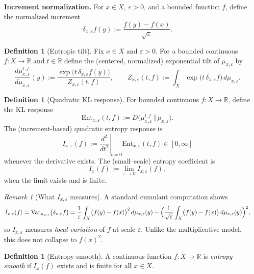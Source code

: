 \documentclass[11pt]{amsart}
\theoremstyle{definition}
\newtheorem{definition}[theorem]{Definition}
\theoremstyle{remark}
\newtheorem{remark}[theorem]{Remark}
\begin{document}
\medskip
\noindent\textbf{Increment normalization.}
For $x\in X$, $\varepsilon>0$, and a bounded function $f$, define the normalized increment
\[
\delta_{x,\varepsilon} f(y):=\frac{f(y)-f(x)}{\sqrt{\varepsilon}}.
\]

\begin{definition}[Entropic tilt]
Fix $x\in X$ and $\varepsilon>0$. For a bounded continuous $f:X\to\mathbb{R}$ and $t\in\mathbb{R}$ define the (centered, normalized) exponential tilt of $\mu_{x,\varepsilon}$ by
\[
\frac{d\mu^{t,f}_{x,\varepsilon}}{d\mu_{x,\varepsilon}}(y)
:= \frac{\exp\bigl(t\,\delta_{x,\varepsilon} f(y)\bigr)}{Z_{x,\varepsilon}(t,f)},
\qquad
Z_{x,\varepsilon}(t,f):=\int_X \exp\bigl(t\,\delta_{x,\varepsilon} f\bigr)\,d\mu_{x,\varepsilon}.
\]
\end{definition}

\begin{definition}[Quadratic KL response]
For bounded continuous $f:X\to\mathbb{R}$, define the KL response
\[
\mathrm{Ent}_{x,\varepsilon}(t,f):=D\bigl(\mu^{t,f}_{x,\varepsilon}\,\Vert\,\mu_{x,\varepsilon}\bigr).
\]
The (increment-based) quadratic entropy response is
\[
I_{x,\varepsilon}(f)
:= \left.\frac{d^2}{dt^2}\right|_{t=0} \mathrm{Ent}_{x,\varepsilon}(t,f)
\in[0,\infty]
\]
whenever the derivative exists.  The (small--scale) entropy coefficient is
\[
I_x(f):=\lim_{\varepsilon\to 0} I_{x,\varepsilon}(f),
\]
when the limit exists and is finite.
\end{definition}

\begin{remark}[What $I_{x,\varepsilon}$ measures]
A standard cumulant computation shows
\[
I_{x,\varepsilon}(f)=\mathrm{Var}_{\mu_{x,\varepsilon}}\bigl(\delta_{x,\varepsilon} f\bigr)
=\frac{1}{\varepsilon}\int_X \bigl(f(y)-f(x)\bigr)^2\,d\mu_{x,\varepsilon}(y)
-\Bigl(\frac{1}{\sqrt{\varepsilon}}\int_X \bigl(f(y)-f(x)\bigr)\,d\mu_{x,\varepsilon}(y)\Bigr)^2,
\]
so $I_{x,\varepsilon}$ measures \emph{local variation} of $f$ at scale $\varepsilon$.
Unlike the multiplicative model, this does not collapse to $f(x)^2$.
\end{remark}

\begin{definition}[Entropy-smooth]
A continuous function $f:X\to\mathbb{R}$ is \emph{entropy--smooth} if $I_x(f)$ exists and is finite for all $x\in X$.
\end{definition}
\end{document}
